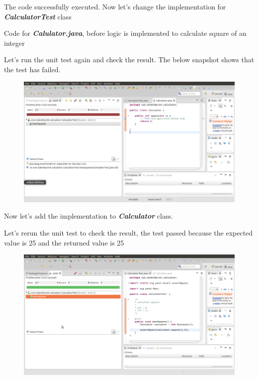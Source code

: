 \documentclass[11pt,a4paper]{article}
\begin{document}
The code successfully executed.
Now let's change the implementation for \emph{\textbf{CalculatorTest}} class



Code for \emph{\textbf{Calulator.java}}, before logic is implemented to calculate square of an integer



Let's run the unit test again and check the result. The below snapshot shows that the test has failed.
\begin{figure}[H]
\begin{center}
\includegraphics[scale=0.30]{CalculatorTest-2.png}
\end{center}
\end{figure}

\pagebreak
Now let's add the implementation to \emph{\textbf{Calculator}} class.



Let's rerun the unit test to check the result, the test passed because the expected value is 25 and the returned value is 25

\begin{figure}[H]
\begin{center}
\includegraphics[scale=0.30]{CalculatorTest-3.png}
\end{center}
\end{figure}
\end{document}
